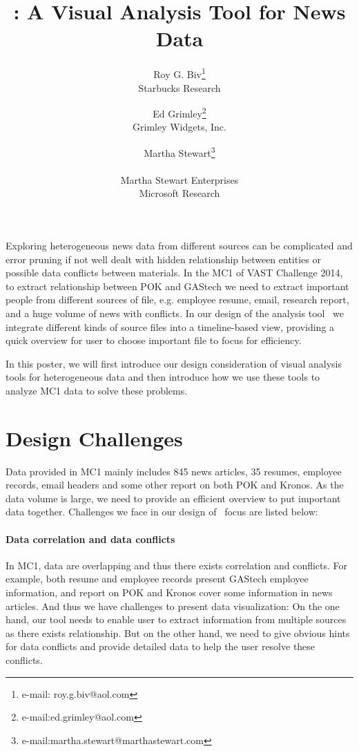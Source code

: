 \documentclass{vgtc}                          %
\title{\projectname: A Visual Analysis Tool for News Data}
\author{Roy G. Biv\thanks{e-mail: roy.g.biv@aol.com}\\ %
        \scriptsize Starbucks Research %
\and Ed Grimley\thanks{e-mail:ed.grimley@aol.com}\\ %
     \scriptsize Grimley Widgets, Inc. %
\and Martha Stewart\thanks{e-mail:martha.stewart@marthastewart.com}\\ %
     \parbox{1.4in}{\scriptsize \centering Martha Stewart Enterprises \\ Microsoft Research}}
\begin{document}


\maketitle

Exploring heterogeneous news data from different sources can be complicated and error pruning if not well dealt with hidden relationship between entities or possible data conflicts between materials. 
In the MC1 of VAST Challenge 2014, to extract relationship between POK and GAStech we need to extract important people from different sources of file, e.g. employee resume, email, research report, and a huge volume of news with conflicts. 
In our design of the analysis tool \projectname\ we integrate different kinds of source files into a timeline-based view, providing a quick overview for user to choose important file to focus for efficiency. 
\par
In this poster, we will first introduce our design consideration of visual analysis tools for heterogeneous data and then introduce how we use these tools to analyze MC1 data to solve these problems.


\section{Design Challenges}
Data provided in MC1 mainly includes 845 news articles, 35 resumes, employee records, email headers and some other report on both POK and Kronos. As the data volume is large, we need to provide an efficient overview to put important data together. Challenges we face in our design of \projectname\ focus are listed below:
\paragraph{Data correlation and data conflicts}
In MC1, data are overlapping and thus there exists correlation and conflicts. For example, both resume and employee records present GAStech employee information, and report on POK and Kronos cover some information in news articles. And thus we have challenges to present data visualization: On the one hand, our tool needs to enable user to extract information from multiple sources as there exists relationship.
But on the other hand, we need to give obvious hints for data conflicts and provide detailed data to help the user resolve these conflicts. 
\end{document}
